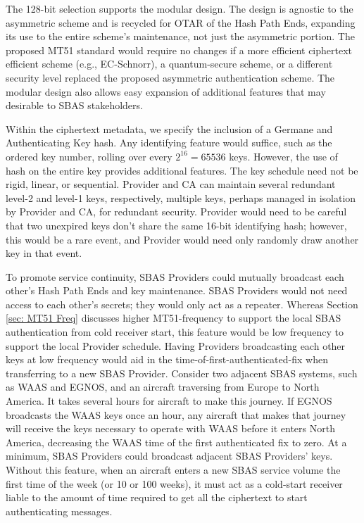 \documentclass[letterpaper,times]{IONconf/IONconf}
\begin{document}
The 128-bit selection supports the modular design.
The design is agnostic to the asymmetric scheme and is recycled for OTAR of the Hash Path Ends, expanding its use to the entire scheme's maintenance, not just the asymmetric portion.
The proposed MT51 standard would require no changes if a more efficient ciphertext efficient scheme (e.g., EC-Schnorr), a quantum-secure scheme, or a different security level replaced the proposed asymmetric authentication scheme.
The modular design also allows easy expansion of additional features that may desirable to SBAS stakeholders.

Within the ciphertext metadata, we specify the inclusion of a Germane and Authenticating Key hash.
Any identifying feature would suffice, such as the ordered key number, rolling over every $2^{16} = 65536$ keys.
However, the use of hash on the entire key provides additional features.
The key schedule need not be rigid, linear, or sequential.
Provider and CA can maintain several redundant level-2 and level-1 keys, respectively, multiple keys, perhaps managed in isolation by Provider and CA, for redundant security.
Provider would need to be careful that two unexpired keys don't share the same 16-bit identifying hash; however, this would be a rare event, and Provider would need only randomly draw another key in that event.

To promote service continuity, SBAS Providers could mutually broadcast each other's Hash Path Ends and key maintenance.
SBAS Providers would not need access to each other's secrets; they would only act as a repeater.
Whereas Section \ref{sec: MT51 Freq} discusses higher MT51-frequency to support the local SBAS authentication from cold receiver start, this feature would be low frequency to support the local Provider schedule.
Having Providers broadcasting each other keys at low frequency would aid in the time-of-first-authenticated-fix when transferring to a new SBAS Provider.
Consider two adjacent SBAS systems, such as WAAS and EGNOS, and an aircraft traversing from Europe to North America.
It takes several hours for aircraft to make this journey.
If EGNOS broadcasts the WAAS keys once an hour, any aircraft that makes that journey will receive the keys necessary to operate with WAAS before it enters North America, decreasing the WAAS time of the first authenticated fix to zero. 
At a minimum, SBAS Providers could broadcast adjacent SBAS Providers' keys.
Without this feature, when an aircraft enters a new SBAS service volume the first time of the week (or 10 or 100 weeks), it must act as a cold-start receiver liable to the amount of time required to get all the ciphertext to start authenticating messages.
\end{document}
